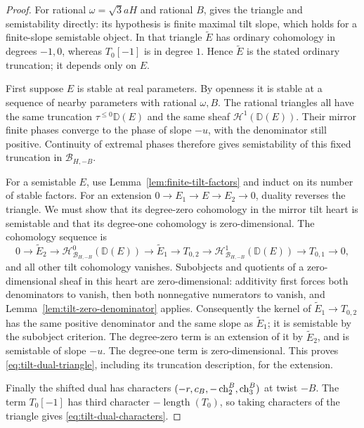 \begin{proof}
For rational $\omega=\sqrt3aH$ and rational $B$,
\cite[Proposition~5.1.3(b)]{BMT2014} gives the triangle and
semistability directly: its hypothesis is finite maximal tilt slope,
which holds for a finite-slope semistable object.  In that triangle
$\widetilde E$ has ordinary cohomology in degrees $-1,0$, whereas
$T_0[-1]$ is in degree $1$.  Hence $\widetilde E$ is the stated
ordinary truncation; it depends only on $E$.

First suppose $E$ is stable at real parameters.  By openness it is
stable at a sequence of nearby parameters with rational $\omega,B$.
The rational triangles all have the same truncation
$\tau^{\le0}\mathbb D(E)$ and the same sheaf
$\mathcal H^1(\mathbb D(E))$.  Their mirror finite phases converge
to the phase of slope $-u$, with the denominator still positive.
Continuity of extremal phases therefore gives semistability of this
fixed truncation in $\mathcal B_{H,-B}$.

For a semistable $E$, use Lemma~\ref{lem:finite-tilt-factors} and
induct on its number of stable factors.  For an extension
$0\to E_1\to E\to E_2\to0$, duality reverses the triangle.
We must show that its degree-zero cohomology in the mirror tilt heart
is semistable and that its degree-one cohomology is zero-dimensional.
The cohomology sequence is
\[
 0\longrightarrow\widetilde E_2\longrightarrow
 \mathcal H^0_{\mathcal B_{H,-B}}(\mathbb D(E))
 \longrightarrow\widetilde E_1\longrightarrow T_{0,2}
 \longrightarrow\mathcal H^1_{\mathcal B_{H,-B}}(\mathbb D(E))
 \longrightarrow T_{0,1}\longrightarrow0,
\]
and all other tilt cohomology vanishes.  Subobjects and quotients
of a zero-dimensional sheaf in this heart are zero-dimensional:
additivity first forces both denominators to vanish, then both
nonnegative numerators to vanish, and
Lemma~\ref{lem:tilt-zero-denominator} applies.
Consequently the kernel of $\widetilde E_1\to T_{0,2}$ has the
same positive denominator and the same slope as $\widetilde E_1$;
it is semistable by the subobject criterion.  The degree-zero term
is an extension of it by $\widetilde E_2$, and is semistable of
slope $-u$.  The degree-one term is zero-dimensional.  This proves
\eqref{eq:tilt-dual-triangle}, including its truncation description,
for the extension.

Finally the shifted dual has characters $(-r,c_B,-\operatorname{ch}_2^B,\operatorname{ch}_3^B)$
at twist $-B$.  The term $T_0[-1]$ has third character
$-\operatorname{length}(T_0)$, so taking characters of the triangle
gives \eqref{eq:tilt-dual-characters}.
\end{proof}
